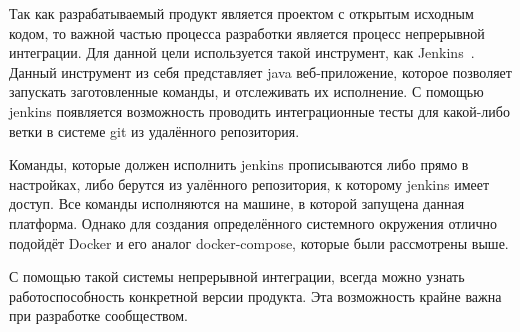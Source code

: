 Так как разрабатываемый продукт является проектом с открытым исходным кодом, то важной частью процесса разработки является процесс непрерывной интеграции.
Для данной цели используется такой инструмент, как Jenkins~\cite{jenkins_documentation}.
Данный инструмент из себя представляет java веб-приложение, которое позволяет запускать заготовленные команды, и отслеживать их исполнение.
С помощью jenkins появляется возможность проводить интеграционные тесты для какой-либо ветки в системе git из удалённого репозитория.

Команды, которые должен исполнить jenkins прописываются либо прямо в настройках, либо берутся из уалённого репозитория, к которому jenkins имеет доступ.
Все команды исполняются на машине, в которой запущена данная платформа.
Однако для создания определённого системного окружения отлично подойдёт Docker и его аналог docker-compose, которые были рассмотрены выше.

С помощью такой системы непрерывной интеграции, всегда можно узнать работоспособность конкретной версии продукта.
Эта возможность крайне важна при разработке сообществом.